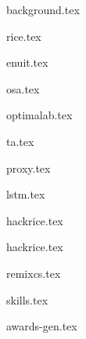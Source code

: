 \documentclass[10pt]{article}
\begin{document}
{background.tex}


{rice.tex}


{enuit.tex}

\vspace{0.1cm}


{osa.tex}

\vspace{0.1cm}

{optimalab.tex}

\vspace{0.1cm}

{ta.tex}





{proxy.tex}

\vspace{0.1cm}

{lstm.tex}

\vspace{0.1cm}

{hackrice.tex}


{hackrice.tex}

\vspace{0.1cm}

{remixcs.tex}


{skills.tex}


{awards-gen.tex}
\end{document}
